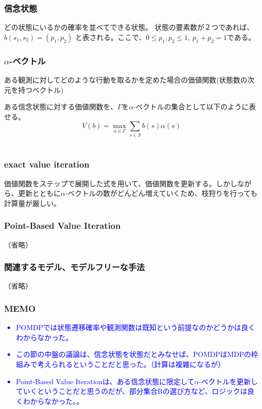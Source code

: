 \documentclass[]{jarticle}
\begin{document}
\subsubsection*{信念状態}
どの状態にいるかの確率を並べてできる状態。
状態の要素数が２つであれば、$b(s_1, s_2) = (p_1, p_2)$ と表される。ここで、$0 \leq p_1, p_2 \leq 1, \: p_1 + p_2 = 1$である。

\subsubsection*{$\alpha$-ベクトル}
ある観測に対してどのような行動を取るかを定めた場合の価値関数(状態数の次元を持つベクトル) 

ある信念状態に対する価値関数を、$\Gamma$を$\alpha$-ベクトルの集合として以下のように表せる。
\begin{equation*}
V(b) = \underset{\alpha \in \Gamma}{\max}\sum_{s \in S}b(s)\alpha(s)
\end{equation*}\\

\subsubsection*{exact value iteration}
価値関数をステップで展開した式を用いて、価値関数を更新する。しかしながら、更新とともに$\alpha$-ベクトルの数がどんどん増えていくため、枝狩りを行っても計算量が厳しい。

\subsubsection*{Point-Based Value Iteration}
（省略）

\subsubsection*{関連するモデル、モデルフリーな手法}
（省略）
	
\subsubsection*{MEMO}
\textcolor{blue}{\begin{itemize}
		\item POMDPでは状態遷移確率や観測関数は既知という前提なのかどうかは良くわからなかった。
		\item この節の中盤の議論は、信念状態を状態だとみなせば、POMDPはMDPの枠組みで考えられるということだと思った。（計算は複雑になるが）
		\item Point-Based Value Iterationは、ある信念状態に限定して$\alpha$-ベクトルを更新していくということだと思うのだが、部分集合Bの選び方など、ロジックは良くわからなかった。。
\end{itemize}}
\end{document}
